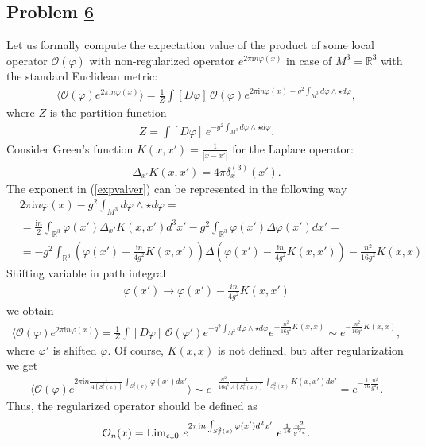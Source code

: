 \documentclass[12pt]{article}
\numberwithin{equation}{section}
\newcommand{\ep}{{\epsilon}}
\theoremstyle{definition}
\newcommand {\CalO} {\mathcal O}
\newcommand {\ii} {\mathrm{i}}
\newcommand{\myhref}[2]{\hyperref[#1]{#2}}%
\begin{document}
\subsection{Problem \myhref{prob6}{6}}
Let us formally compute the expectation value of the product of some local operator $\CalO(\varphi)$ with non-regularized operator $e^{2\pi \ii n {\varphi}(x)}$ in case of $M^{3} =  \mathbb{R}^{3}$ with the standard Euclidean metric:
\begin{align}\label{expvalver}
    \langle \CalO(\varphi) e^{2\pi \ii n {\varphi(x)}} \rangle = \frac{1}{Z}\int [D{\varphi}] \, \CalO(\varphi) e^{2\pi \ii n {\varphi}(x) -g^2 \int_{M^3} d{\varphi} \wedge \star d{\varphi}},
\end{align}
where $Z$ is the partition function
\begin{align*}
    Z = \int [D{\varphi}] \, e^{ - g^2 \int_{M^3} d{\varphi} \wedge \star d{\varphi}}.
\end{align*}
Consider Green's function $K(x, x') = \frac{1}{|x - x'|}$ for the Laplace operator:
\begin{align*}
     \Delta_{x'}K(x, x') = 4 \pi \delta^{(3)}_{x}(x').
\end{align*}
The exponent in (\ref{expvalver}) can be represented in the following way
\begin{align*}
    &2\pi \ii n {\varphi}(x) -g^2 \int_{M^3} d{\varphi} \wedge \star d{\varphi}=\\
    &=\frac{\ii n}{2} \int_{\mathbb{R}^3} {\varphi}(x') \Delta_{x'} K(x, x') d^{3} x' -g^2 \int_{\mathbb{R}^3} {\varphi}(x') \Delta {\varphi}(x') d x' = \\
    &=-g^2 \int_{\mathbb{R}^3} \left({\varphi}(x') - \frac{\ii n}{4g^{2}} K(x, x')\right) \Delta \left({\varphi}(x') - \frac{\ii n}{4g^{2}} K(x, x')\right) - \frac{n^2}{16g^2} K(x, x)
\end{align*}
Shifting variable in path integral
\begin{align*}
   {\varphi}(x') \rightarrow {\varphi}(x') - \frac{in}{4g^{2}} K(x, x')
\end{align*}
we obtain
\begin{align*}
     \langle \CalO(\varphi) e^{2\pi \ii n {\varphi(x)}} \rangle = \frac{1}{Z} \int [D{\varphi}] \, \CalO(\varphi') e^{ -g^2 \int_{M^3} d{\varphi} \wedge \star d{\varphi}} e^{-\frac{n^{2}}{16g^2}K(x, x)} \sim e^{-\frac{n^{2}}{16g^2}K(x, x)},
\end{align*}
where $\varphi'$ is shifted $\varphi$.
Of course, $K(x, x)$ is not defined, but after regularization we get
\begin{align*}
     \langle \CalO(\varphi) e^{2\pi \ii n \frac{1}{A(S^{2}_{\epsilon}(x))}\int_{S^{2}_{\epsilon}(x)}{\varphi(x')}dx'} \rangle \sim e^{-\frac{n^{2}}{16g^2}\frac{1}{A(S^2_{\epsilon}(x))}\int_{S^{2}_{\epsilon}(x)}K(x, x')dx'} = e^{-\frac{1}{16}\frac{n^2}{g^2\epsilon}}.
\end{align*}
Thus, the regularized operator should be defined as
\begin{align*}
    {\CalO}_{n}(x) = {\rm Lim}_{{\ep} \downarrow 0} \ e^{2\pi \ii n \int_{S^{2}_{\ep}(x)} {\varphi}(x') d^2x'}\ e^{\frac{1}{16} \frac{n^2}{g^2 \ep}}.
\end{align*}
\end{document}
